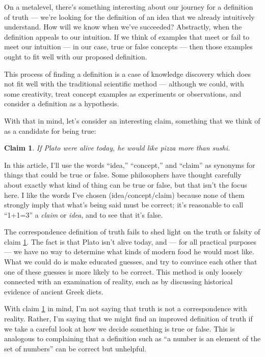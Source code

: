 \documentclass[11pt, oneside]{article}   	%
\newtheorem{claim}{Claim}
\begin{document}
On a metalevel, there's something interesting about our journey for a definition
of truth --- we're
looking for the definition of an idea that we already intuitively understand.
How will we know when we've succeeded? Abstractly, when the definition
appeals to our intuition.
If we think of examples that meet or fail to meet our intuition --- in our case,
true or false concepts --- then those examples ought to fit well with our
proposed definition.

This process of finding a definition is a case of
knowledge discovery which does not fit well with the traditional scientific
method --- although we could, with some creativity, treat concept examples as
experiments or observations, and consider a definition as a hypothesis.

With that in mind, let's consider an interesting claim, something that we
think of as a candidate for being true:
\begin{claim}\label{c1}
    If Plato were alive today, he would like pizza more than sushi.
\end{claim}
In this article, I'll use the words ``idea,'' ``concept,'' and ``claim'' as
synonyms for things that could be true or false. Some philosophers have thought
carefully about exactly what kind of thing can be true or false, but that isn't
the
focus here. I like the words I've chosen (idea/concept/claim) because none of
them strongly imply that what's being said must be correct; it's reasonable to
call ``1+1=3'' a {\em claim} or {\em idea}, and to see that it's false.

The correspondence definition of truth fails to shed light
on the truth or falsity of claim \ref{c1}.
The fact is that Plato isn't alive today, and --- for all practical purposes
--- we have no way to determine what kinds of modern food he would most like.
What we could do is make educated guesses, and try to convince each other
that one of these guesses is more likely to be correct.
This method is only loosely connected with an examination of reality, such as by
discussing historical evidence of ancient Greek diets.

With claim \ref{c1} in mind, I'm not saying that truth is not a correspondence
with reality.
Rather, I'm saying that we might find an improved definition of truth if we take
a careful look at how we decide something is true or false.
This is analogous to complaining that a definition such as ``a number is an
element of the set of numbers'' can be correct but unhelpful.
\end{document}
